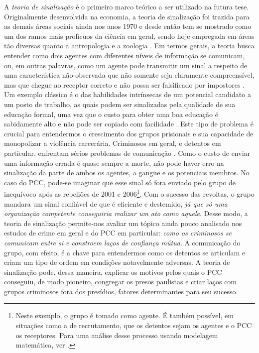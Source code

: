 \documentclass[a4paper,11pt]{article}
\begin{document}
A \textit{teoria de sinalização} é o primeiro marco teórico a ser utilizado na futura tese. Originalmente desenvolvida na economia, a teoria de sinalização foi trazida para as demais áreas sociais ainda nos anos 1970 e desde então tem se mostrado como um dos ramos mais profícuos da ciência em geral, sendo hoje empregada em áreas tão diversas quanto a antropologia e a zoologia \citep{connelly2011signaling, cook2007cooperation}. Em termos gerais, a teoria busca entender como dois agentes com diferentes níveis de informação se comunicam, ou, em outras palavras, como um agente pode transmitir um sinal a respeito de uma característica não-observada que não somente seja claramente compreensível, mas que chegue ao receptor correto e não possa ser falsificado por impostores \citep{gambetta2009signaling}. Um exemplo clássico é o das habilidades intrínsecas de um potencial candidato a um posto de trabalho, as quais podem ser sinalizadas pela qualidade de sua educação formal, uma vez que o custo para obter uma boa educação é sabidamente alto e não pode ser copiado com facilidade \citep{spence1973job}. Este tipo de problema é crucial para entendermos o crescimento dos grupos prisionais e sua capacidade de monopolizar a violência carcerária. Criminosos em geral, e detentos em particular, enfrentam sérios problemas de comunicação \citep{freire2014entering, gambetta2009codes}. Como o custo de enviar uma informação errada é quase sempre a morte, não pode haver erro na sinalização da parte de ambos os agentes, a gangue e os potenciais membros. No caso do PCC, pode-se imaginar que esse sinal só fora enviado pelo grupo de inequívoco após as rebeliões de 2001 e 2006\footnote{Neste exemplo, o grupo é tomado como agente. É também possível, em situações como a de recrutamento, que os detentos sejam os agentes e o PCC os receptores. Para uma análise desse processo usando modelagem matemática, ver \citet{freire2014entering}.}. Com o sucesso das revoltas, o grupo mandara um sinal confiável de que é eficiente e destemido, \textit{já que só uma organização competente conseguiria realizar um ato como aquele}. Desse modo, a teoria de sinalização permite-nos avaliar um tópico ainda pouco analisado nos estudos de crime em geral e do PCC em particular: \textit{como os criminosos se comunicam entre si e constroem laços de confiança mútua}. A comunicação do grupo, com efeito, é a chave para entendermos como os detentos se articulam e criam um tipo de ordem em condições notavelmente adversas. A teoria de sinalização pode, dessa maneira, explicar os motivos pelos quais o PCC conseguiu, de modo pioneiro, congregar os presos paulistas e criar laços com grupos criminosos fora dos presídios, fatores determinantes para seu sucesso.
\end{document}
